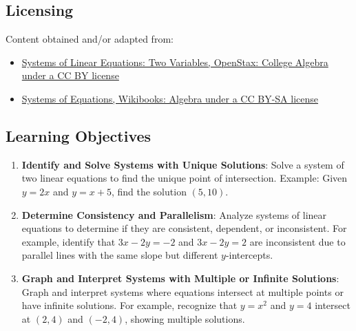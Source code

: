\subsection{Licensing}
\label{sss:lice-7352}

Content obtained and/or adapted from:

\begin{itemize}
    \item \href{https://openstax.org/books/college-algebra/pages/7-1-systems-of-linear-equations-two-variables}{Systems of Linear Equations: Two Variables, OpenStax: College Algebra under a CC BY license}
    \item \href{https://en.wikibooks.org/wiki/Algebra/Systems_of_Equations}{Systems of Equations, Wikibooks: Algebra under a CC BY-SA license}
\end{itemize}

\subsection{Learning Objectives}
\label{ssec:lear-d4a2}

\begin{enumerate}
    \item \textbf{Identify and Solve Systems with Unique Solutions}: Solve a system of two linear equations to find the unique point of intersection. Example: Given $y = 2x$ and $y = x + 5$, find the solution $(5, 10)$.
    \item \textbf{Determine Consistency and Parallelism}: Analyze systems of linear equations to determine if they are consistent, dependent, or inconsistent. For example, identify that $3x - 2y = -2$ and $3x - 2y = 2$ are inconsistent due to parallel lines with the same slope but different $y$-intercepts.
    \item \textbf{Graph and Interpret Systems with Multiple or Infinite Solutions}: Graph and interpret systems where equations intersect at multiple points or have infinite solutions. For example, recognize that $y = x^2$ and $y = 4$ intersect at $(2, 4)$ and $(-2, 4)$, showing multiple solutions.
\end{enumerate}

